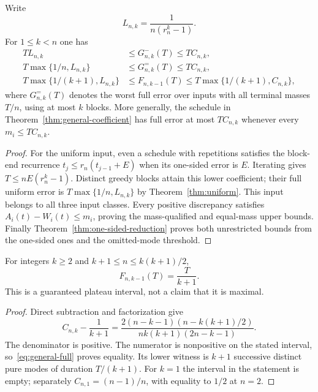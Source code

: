 \begin{corollary}
\label{cor:general-bounds}
Write
\begin{equation}\label{eq:uniform-lower-general}
 L_{n,k}=\frac1{n(r_n^k-1)}.
\end{equation}
For $1\le k<n$ one has
\begin{align}
 TL_{n,k}&\le G^-_{n,k}(T)\le TC_{n,k},\label{eq:general-one-sided}\\
 T\max\{1/n,L_{n,k}\}&\le G^=_{n,k}(T)\le TC_{n,k},
       \label{eq:general-equal}\\
 T\max\{1/(k+1),L_{n,k}\}&\le F_{n,k-1}(T)
 \le T\max\{1/(k+1),C_{n,k}\},\label{eq:general-full}
\end{align}
where $G^=_{n,k}(T)$ denotes the worst full error over inputs with all
terminal masses $T/n$, using at most $k$ blocks. More generally, the
schedule in Theorem~\ref{thm:general-coefficient} has full error at most
$TC_{n,k}$ whenever every $m_i\le TC_{n,k}$.
\end{corollary}
\begin{proof}
For the uniform input, even a schedule with repetitions satisfies the
block-end recurrence $t_j\le r_n(t_{j-1}+E)$ when its one-sided error
is $E$. Iterating gives $T\le nE(r_n^k-1)$. Distinct greedy blocks attain
this lower coefficient; their full uniform error is
$T\max\{1/n,L_{n,k}\}$ by Theorem~\ref{thm:uniform}.
This input belongs to all three input classes. Every positive discrepancy
satisfies $A_i(t)-W_i(t)\le m_i$, proving the mass-qualified and equal-mass
upper bounds. Finally Theorem~\ref{thm:one-sided-reduction} proves both
unrestricted bounds from the one-sided ones and the omitted-mode threshold.
\end{proof}

\begin{corollary}\label{cor:general-plateau}
For integers $k\ge2$ and $k+1\le n\le k(k+1)/2$,
\begin{equation}\label{eq:general-plateau}
 F_{n,k-1}(T)=\frac{T}{k+1}.
\end{equation}
This is a guaranteed plateau interval, not a claim that it is maximal.
\end{corollary}
\begin{proof}
Direct subtraction and factorization give
\begin{equation}\label{eq:plateau-factor}
 C_{n,k}-\frac1{k+1}
 =\frac{2(n-k-1)(n-k(k+1)/2)}{nk(k+1)(2n-k-1)}.
\end{equation}
The denominator is positive. The numerator is nonpositive on the stated
interval, so~\eqref{eq:general-full} proves equality. Its lower witness
is $k+1$ successive distinct pure modes of duration $T/(k+1)$.
For $k=1$ the interval in the statement is empty; separately
$C_{n,1}=(n-1)/n$, with equality to $1/2$ at $n=2$.
\end{proof}

